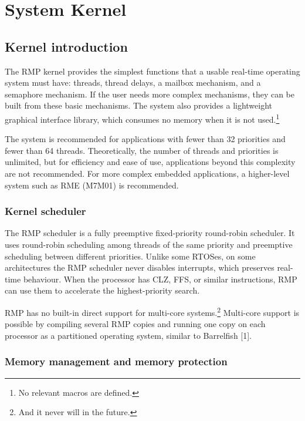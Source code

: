 \chapter{System Kernel}\label{ch:kernel}

\section{Kernel introduction}

The RMP kernel provides the simplest functions that a usable real-time operating system must have: threads, thread delays, a mailbox mechanism, and a semaphore mechanism.
If the user needs more complex mechanisms, they can be built from these basic mechanisms.
The system also provides a lightweight graphical interface library, which consumes no memory when it is not used.\footnote{No relevant macros are defined.}

The system is recommended for applications with fewer than 32 priorities and fewer than 64 threads.
Theoretically, the number of threads and priorities is unlimited, but for efficiency and ease of use, applications beyond this complexity are not recommended.
For more complex embedded applications, a higher-level system such as RME (M7M01) is recommended.

\subsection{Kernel scheduler}

The RMP scheduler is a fully preemptive fixed-priority round-robin scheduler.
It uses round-robin scheduling among threads of the same priority and preemptive scheduling between different priorities.
Unlike some RTOSes, on some architectures the RMP scheduler never disables interrupts, which preserves real-time behaviour.
When the processor has CLZ, FFS, or similar instructions, RMP can use them to accelerate the highest-priority search.

RMP has no built-in direct support for multi-core systems.\footnote{And it never will in the future.}
Multi-core support is possible by compiling several RMP copies and running one copy on each processor as a partitioned operating system, similar to Barrelfish [1].

\subsection{Memory management and memory protection}

